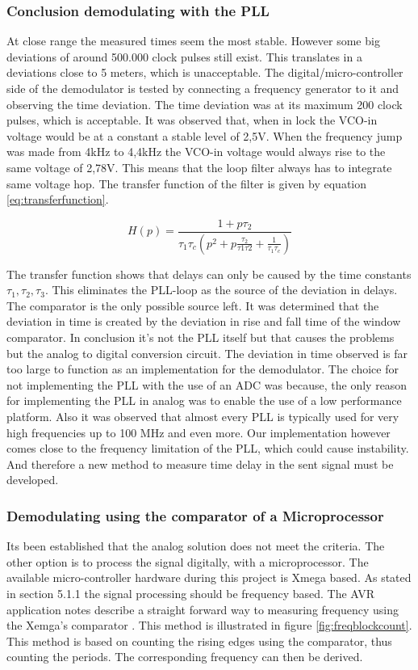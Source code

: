 \documentclass[10pt,a4paper]{article}
\begin{document}
\subsubsection{Conclusion demodulating with the PLL}
At close range the measured times seem the most stable. However some big deviations of around 500.000 clock pulses still exist. This translates in a deviations close to 5 meters, which is unacceptable. 
The digital/micro-controller side of the demodulator is tested by connecting a frequency generator to it and observing the time deviation. The time deviation was at its maximum 200 clock pulses, which is acceptable. It was observed that, when in lock the VCO-in voltage would be at a constant a stable level of 2,5V. When the frequency jump was made from 4kHz to 4,4kHz the VCO-in voltage would always rise to the same voltage of 2,78V. This means that the loop filter always has to integrate same voltage hop. The transfer function of the filter is given by equation \ref{eq:transferfunction}\cite{plldavid}.

\begin{equation}
H(p)=\frac{1+ p\tau_2}{\tau_1\tau_c(p^2+p\frac{\tau_2}{\tau1\tau2}+\frac{1}{\tau_1\tau_c})}
\label{eq:transferfunction}
\end{equation}

The transfer function shows that delays can only be caused by the time constants $\tau_1,\tau_2,\tau_3$. This eliminates the PLL-loop as the source of the deviation in delays. The comparator is the only possible source left. It was determined that the deviation in time is created by the deviation in rise and fall time of the window comparator. In conclusion it's not the PLL itself but that causes the problems but the analog to digital conversion circuit. The deviation in time observed is far too large to function as an implementation for the demodulator. The choice for not implementing the PLL with the use of an ADC was because, the only reason for implementing the PLL in analog was to enable the use of a low performance platform. Also it was observed that almost every PLL is typically used for very high frequencies up to 100 MHz and even more. Our implementation however comes close to the frequency limitation of the PLL, which could cause instability. And therefore a new method to measure time delay in the sent signal must be developed.

\subsubsection{Demodulating using the comparator of a Microprocessor}
Its been established that the analog solution does not meet the criteria. The other option is to process the signal digitally, with a microprocessor. The available micro-controller hardware during this project is Xmega based. As stated in section 5.1.1 the signal processing should be frequency based. The AVR application notes describe a straight forward way to measuring frequency using the Xemga's comparator \cite{avrfrequency}. This method is illustrated in figure \ref{fig:freqblockcount}. This method is based on counting the rising edges using the comparator, thus counting the periods. The corresponding frequency can then be derived.  
\end{document}
